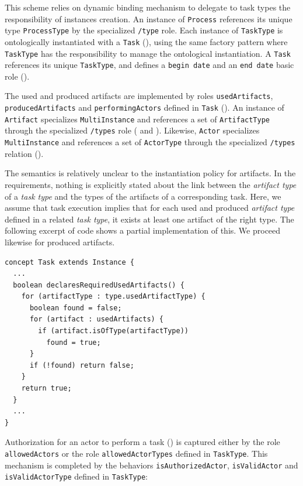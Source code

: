 This scheme relies on \FML dynamic binding mechanism to delegate to task types
the responsibility of instances creation. An instance of \texttt{Process}
references its unique type \texttt{ProcessType} by the specialized
\texttt{/type} role. Each instance of \texttt{TaskType} is ontologically
instantiated with a \texttt{Task} (), using the same factory
pattern where \texttt{TaskType} has the responsibility to manage the
ontological instantiation. A \texttt{Task} references its unique
\texttt{TaskType}, and defines a \texttt{begin date} and an \texttt{end date}
basic role ().

The used and produced artifacts are implemented by roles
\texttt{usedArtifacts}, \texttt{producedArtifacts} and
\texttt{performingActors} defined in \texttt{Task} (). An instance
of \texttt{Artifact} specializes \texttt{MultiInstance} and references a set of
\texttt{ArtifactType} through the specialized \texttt{/types} role
( and ). Likewise, \texttt{Actor} specializes
\texttt{MultiInstance} and references a set of \texttt{ActorType} through the
specialized \texttt{/types} relation ().

The semantics is relatively unclear to the instantiation policy for artifacts.
In the requirements, nothing is explicitly stated about the link between the
\emph{artifact type} of a \emph{task type} and the types of the artifacts of a
corresponding task.  Here, we assume that task execution implies that for each
used and produced \emph{artifact type} defined in a related \emph{task type},
it exists at least one artifact of the right type. The following excerpt of
\FML code shows a partial implementation of this. We proceed likewise for
produced artifacts.

\begin{lstlisting}
concept Task extends Instance {
  ...
  boolean declaresRequiredUsedArtifacts() {
    for (artifactType : type.usedArtifactType) {
      boolean found = false;
      for (artifact : usedArtifacts) {
        if (artifact.isOfType(artifactType))
          found = true;
      }
      if (!found) return false;
    }
    return true;
  }
  ...
}
\end{lstlisting}

Authorization for an actor to perform a task () is captured either
by the role \texttt{allowedActors} or the role \texttt{allowedActorTypes}
defined in \texttt{TaskType}. This mechanism is completed by the behaviors
\texttt{isAuthorizedActor}, \texttt{isValidActor} and \texttt{isValidActorType}
defined in \texttt{TaskType}:

